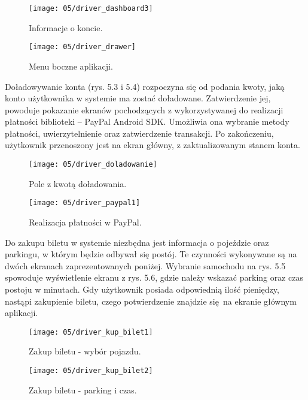 \begin{figure}[h]
	\centering
	\begin{minipage}[b]{0.25\textwidth}
		\texttt{[image: 05/driver\_dashboard3]}
		\caption{Informacje o koncie.}
	\end{minipage}
	\hspace{3cm}
	\begin{minipage}[b]{0.25\textwidth}
		\texttt{[image: 05/driver\_drawer]}
		\caption{Menu boczne aplikacji.}
	\end{minipage}
\end{figure}

Doładowywanie konta (rys. 5.3 i 5.4) rozpoczyna się od podania kwoty, jaką konto użytkownika w systemie ma zostać doładowane. Zatwierdzenie jej, powoduje pokazanie ekranów pochodzących z wykorzystywanej do realizacji płatności biblioteki -- PayPal Android SDK. Umożliwia ona wybranie metody płatności, uwierzytelnienie oraz zatwierdzenie transakcji. Po zakończeniu, użytkownik przenoszony jest na ekran główny, z zaktualizowanym stanem konta.

\newpage

\begin{figure}[h!]
	\centering
	\begin{minipage}[b]{0.25\textwidth}
		\texttt{[image: 05/driver\_doladowanie]}
		\caption{Pole z kwotą doładowania.}
	\end{minipage}
	\hspace{3cm}
	\begin{minipage}[b]{0.25\textwidth}
		\texttt{[image: 05/driver\_paypal1]}
		\caption{Realizacja płatności w PayPal.}
	\end{minipage}
\end{figure}

Do zakupu biletu w systemie niezbędna jest informacja o pojeździe oraz parkingu, w którym będzie odbywał się postój. Te czynności wykonywane są na dwóch ekranach zaprezentowanych poniżej. Wybranie samochodu na rys. 5.5 spowoduje wyświetlenie ekranu z rys. 5.6, gdzie należy wskazać parking oraz czas postoju w minutach. Gdy użytkownik posiada odpowiednią ilość pieniędzy, nastąpi zakupienie biletu, czego potwierdzenie znajdzie się na ekranie głównym aplikacji.

\begin{figure}[h!]
	\centering
	\begin{minipage}[b]{0.25\textwidth}
		\texttt{[image: 05/driver\_kup\_bilet1]}
		\caption{Zakup biletu - wybór pojazdu.}
	\end{minipage}
	\hspace{3cm}
	\begin{minipage}[b]{0.25\textwidth}
		\texttt{[image: 05/driver\_kup\_bilet2]}
		\caption{Zakup biletu - parking i czas.}
	\end{minipage}
\end{figure}

